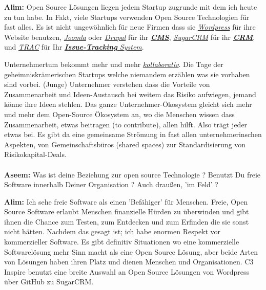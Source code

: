 \documentclass[10pt,a4paper,ngerman,twoside]{article} %
\begin{document}
\begin{multicols}{3}
\textbf{Alim:} Open Source Lösungen liegen jedem Startup zugrunde mit dem ich 
heute zu tun habe. In Fakt, viele Startups verwenden Open Source 
Technologien für fast alles. Es ist nicht ungewöhnlich für neue 
Firmen dass sie \href{http://wordpress.org/}{\textit{Wordpress}} für ihre Website 
benutzen, \href{http://www.joomla.de/}{\textit{Joomla}} oder \href{https://drupal.org/}{\textit{Drupal}} für ihr 
\href{https://de.wikipedia.org/wiki/Content-Management-System}{\textit{\textbf{CMS}}}, 
\href{https://de.wikipedia.org/wiki/SugarCRM}{\textit{SugarCRM}} für ihr 
\href{https://de.wikipedia.org/wiki/Customer-Relationship-Management}{\textit{\textbf{CRM}}}, und \href{https://de.wikipedia.org/wiki/Trac}{\textit{TRAC}} für Ihr 
\href{https://de.wikipedia.org/wiki/Issue-Tracking-System}{\textit{\textbf{Issue-Tracking} 
System}}.

Unternehmertum bekommt mehr und mehr \href{https://de.wikipedia.org/wiki/Kollaboration}{\textit{kollaborativ}}. Die Tage der 
geheimniskrämerischen Startups welche niemandem erzählen was sie 
vorhaben sind vorbei. (Junge) Unternehmer verstehen dass die Vorteile von 
Zusammenarbeit und Ideen-Austausch bei weitem das Risiko aufwiegen, 
jemand könne ihre Ideen stehlen. Das ganze Unternehmer-Ökosystem 
gleicht sich mehr und mehr dem Open-Source Ökosystem an, wo die 
Menschen wissen dass Zusammenarbeit, etwas beitragen (to contribute),  
allen hilft. Also trägt jeder etwas bei. Es gibt da eine gemeinsame 
Strömung in fast allen unternehmerinschen Aspekten, von 
Gemeinschaftsbüros (shared spaces) zur Standardisierung von 
Risikokapital-Deals.


\paragraph{}
\textbf{Aseem:} Was ist deine Beziehung zur open source Technologie ? Benutzt 
Du freie Software innerhalb Deiner Organisation ? Auch draußen, 'im 
Feld' ?

\textbf{Alim:} Ich sehe freie Software als einen 'Befähiger' für Menschen. 
Freie, Open Source Software erlaubt Menschen finanzielle Hürden zu 
überwinden und gibt ihnen die Chance zum Testen, zum Entdecken und 
zum Erfinden die sie sonst nicht hätten. Nachdem das gesagt ist; ich 
habe enormen Respekt vor kommerzieller Software. Es gibt definitiv 
Situationen wo eine kommerzielle Softwarelösung mehr Sinn macht als 
eine Open Source Lösung, aber beide Arten von Lösungen haben ihren 
Platz und dienen Menschen und Organisationen. C3 Inspire benutzt eine 
breite Auswahl an Open Source Lösungen von Wordpress über GitHub zu 
SugarCRM.


\end{multicols}
\end{document}
